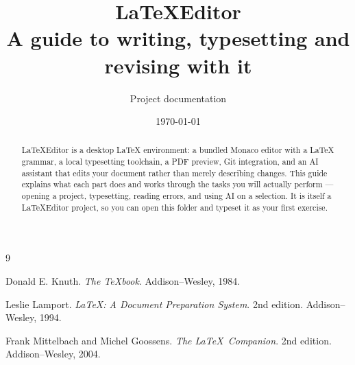 \documentclass[11pt,a4paper]{article}
\title{\textbf{LaTeXEditor}\\[0.3em]
       \large A guide to writing, typesetting and revising with it}
\author{Project documentation}
\date{\today}
\begin{document}
\maketitle

\begin{abstract}
\noindent
LaTeXEditor is a desktop LaTeX environment: a bundled Monaco editor with a
LaTeX grammar, a local typesetting toolchain, a PDF preview, Git integration,
and an AI assistant that edits your document rather than merely describing
changes. This guide explains what each part does and works through the tasks
you will actually perform --- opening a project, typesetting, reading errors,
and using AI on a selection. It is itself a LaTeXEditor project, so you can
open this folder and typeset it as your first exercise.
\end{abstract}

\tableofcontents








\begin{thebibliography}{9}

Donald E. Knuth.
\emph{The \TeX book}.
Addison--Wesley, 1984.

Leslie Lamport.
\emph{\LaTeX: A Document Preparation System}.
2nd edition. Addison--Wesley, 1994.

Frank Mittelbach and Michel Goossens.
\emph{The \LaTeX\ Companion}.
2nd edition. Addison--Wesley, 2004.

\end{thebibliography}
\end{document}
